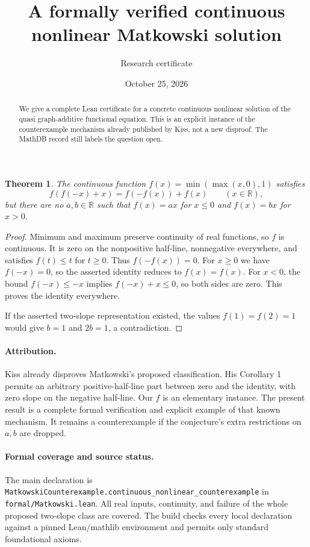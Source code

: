 \documentclass[11pt]{article}
\title{A formally verified continuous nonlinear Matkowski solution}
\author{Research certificate}
\date{October 25, 2026}
\newtheorem{theorem}{Theorem}
\begin{document}
\maketitle
\begin{abstract}
We give a complete Lean certificate for a concrete continuous nonlinear
solution of the quasi graph-additive functional equation. This is an
explicit instance of the counterexample mechanism already published by
Kiss, not a new disproof. The MathDB record still labels the question open.
\end{abstract}
\begin{theorem}
The continuous function $f(x)=\min(\max(x,0),1)$ satisfies
\[
 f(f(-x)+x)=f(-f(x))+f(x)\qquad(x\in\mathbb R),
\]
but there are no $a,b\in\mathbb R$ such that $f(x)=ax$ for $x\le0$ and
$f(x)=bx$ for $x>0$.
\end{theorem}
\begin{proof}
Minimum and maximum preserve continuity of real functions, so $f$ is
continuous. It is zero on the nonpositive half-line, nonnegative
everywhere, and satisfies $f(t)\le t$ for $t\ge0$. Thus $f(-f(x))=0$.
For $x\ge0$ we have $f(-x)=0$, so the asserted identity reduces to
$f(x)=f(x)$. For $x<0$, the bound $f(-x)\le -x$ implies
$f(-x)+x\le0$, so both sides are zero. This proves the identity everywhere.

If the asserted two-slope representation existed, the values
$f(1)=f(2)=1$ would give $b=1$ and $2b=1$, a contradiction.
\end{proof}
\paragraph{Attribution.}
Kiss \cite{Kiss} already disproves Matkowski's proposed classification.
His Corollary 1 permits an arbitrary positive-half-line part between zero
and the identity, with zero slope on the negative half-line. Our $f$ is
an elementary instance. The present result is a complete formal
verification and explicit example of that known mechanism. It remains a
counterexample if the conjecture's extra restrictions on $a,b$ are dropped.

\paragraph{Formal coverage and source status.}
The main declaration is
\texttt{MatkowskiCounterexample.continuous\_nonlinear\_counterexample} in
\texttt{formal/Matkowski.lean}. All real inputs, continuity, and failure of
the whole proposed two-slope class are covered. The build checks every
local declaration against a pinned Lean/mathlib environment and permits
only standard foundational axioms.
\end{document}
